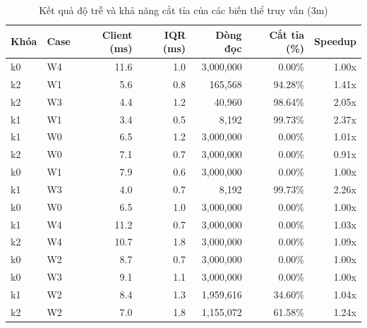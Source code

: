 \begin{table}[htbp]
\centering
\caption{Kết quả độ trễ và khả năng cắt tỉa của các biến thể truy vấn (3m)}
\label{tab:queries_3m}
\begin{tabular}{llrrrrr}
\toprule
\textbf{Khóa} & \textbf{Case} & \textbf{Client (ms)} & \textbf{IQR (ms)} & \textbf{Dòng đọc} & \textbf{Cắt tỉa (\%)} & \textbf{Speedup} \\
\midrule
    k0 & W4 & 11.6 & 1.0 & 3,000,000 & 0.00\% & 1.00x \\
    k2 & W1 & 5.6 & 0.8 & 165,568 & 94.28\% & 1.41x \\
    k2 & W3 & 4.4 & 1.2 & 40,960 & 98.64\% & 2.05x \\
    k1 & W1 & 3.4 & 0.5 & 8,192 & 99.73\% & 2.37x \\
    k1 & W0 & 6.5 & 1.2 & 3,000,000 & 0.00\% & 1.01x \\
    k2 & W0 & 7.1 & 0.7 & 3,000,000 & 0.00\% & 0.91x \\
    k0 & W1 & 7.9 & 0.6 & 3,000,000 & 0.00\% & 1.00x \\
    k1 & W3 & 4.0 & 0.7 & 8,192 & 99.73\% & 2.26x \\
    k0 & W0 & 6.5 & 1.0 & 3,000,000 & 0.00\% & 1.00x \\
    k1 & W4 & 11.2 & 0.7 & 3,000,000 & 0.00\% & 1.03x \\
    k2 & W4 & 10.7 & 1.8 & 3,000,000 & 0.00\% & 1.09x \\
    k0 & W2 & 8.7 & 0.7 & 3,000,000 & 0.00\% & 1.00x \\
    k0 & W3 & 9.1 & 1.1 & 3,000,000 & 0.00\% & 1.00x \\
    k1 & W2 & 8.4 & 1.3 & 1,959,616 & 34.60\% & 1.04x \\
    k2 & W2 & 7.0 & 1.8 & 1,155,072 & 61.58\% & 1.24x \\
\bottomrule
\end{tabular}
\end{table}
